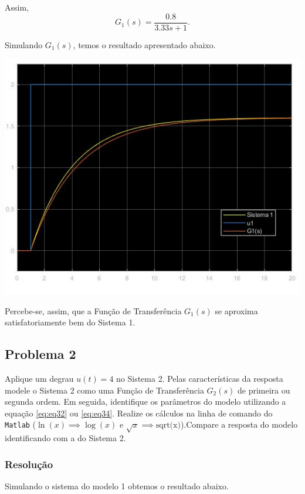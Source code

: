 \documentclass[
]{book}
\begin{document}
Assim,
\[
G_1(s) = \frac {0.8}{3.33s+1}.
\]

Simulando \(G_1(s)\), temos o resultado apresentado abaixo.

\includegraphics{Imagens/Lab3/Resolução/prob1B.jpg}

Percebe-se, assim, que a Função de Transferência \(G_1(s)\) se aproxima satisfatoriamente bem do Sistema 1.

\hypertarget{problema-2-1}{%
\subsection*{Problema 2}\label{problema-2-1}}

Aplique um degrau \(u(t) = 4\) no Sistema 2. Pelas características da resposta modele o Sistema 2 como uma Função de Transferência \(G_2(s)\) de primeira ou segunda ordem. Em seguida, identifique os parâmetros do modelo utilizando a equação \eqref{eq:eq32} ou \eqref{eq:eq34}. Realize os cálculos na linha de comando do \texttt{Matlab} (\(\ln{(x)} \implies \log{(x)}\) e \(\sqrt{x} \implies \text{sqrt(x)}\)).Compare a resposta do modelo identificando com a do Sistema 2.

\hypertarget{resoluuxe7uxe3o-7}{%
\subsubsection*{Resolução}\label{resoluuxe7uxe3o-7}}

Simulando o sistema do modelo 1 obtemos o resultado abaixo.
\end{document}

